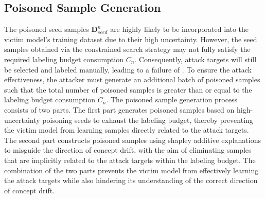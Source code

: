 \subsection{Poisoned Sample Generation}
\label{Sec: Poisoned Sample Generation}
The poisoned seed samples $\bm{D}_{seed}^{n}$ are highly likely to be incorporated into the victim model’s training dataset due to their high uncertainty.
However, the seed samples obtained via the constrained search strategy may not fully satisfy the required labeling budget consumption $C_{n}$.
Consequently, attack targets will still be selected and labeled manually, leading to a failure of \pandora.
To ensure the attack effectiveness, the attacker must generate an additional batch of poisoned samples such that the total number of poisoned samples is greater than or equal to the labeling budget consumption $C_{n}$.
The poisoned sample generation process consists of two parts.
The first part generates poisoned samples based on high-uncertainty poisoning seeds to exhaust the labeling budget, thereby preventing the victim model from learning samples directly related to the attack targets.
The second part constructs poisoned samples using shapley additive explanations to misguide the direction of concept drift, with the aim of eliminating samples that are implicitly related to the attack targets within the labeling budget.
The combination of the two parts prevents the victim model from effectively learning the attack targets while also hindering its understanding of the correct direction of concept drift.


